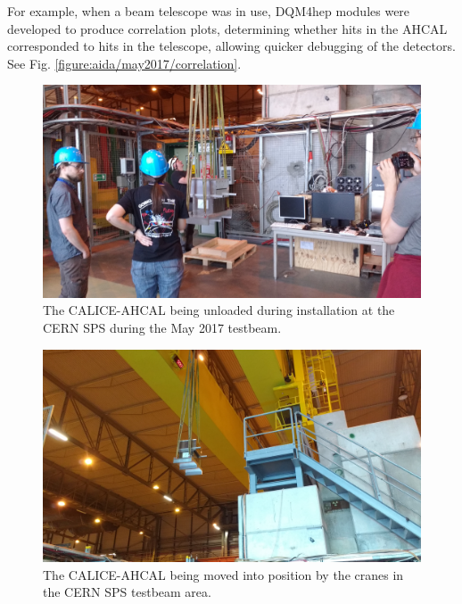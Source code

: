 For example, when a beam telescope was in use, DQM4hep modules were developed to produce correlation plots, determining whether hits in the AHCAL corresponded to hits in the telescope, allowing quicker debugging of the detectors. See Fig. \ref{figure:aida/may2017/correlation}.

\begin{figure}[p]
	\centering
	\includegraphics[width=1\textwidth]{../Pictures/AHCAL-CERN-2017-Installation-1.jpg}
	\caption{The \acrshort{CALICE}-\acrshort{AHCAL} being unloaded during installation at the \acrshort{CERN} \acrshort{SPS} during the May 2017 testbeam.}
	\label{figure:aida/may2017/installation-1}
\end{figure}

\begin{figure}[p]
	\centering
	\includegraphics[width=1\textwidth]{../Pictures/AHCAL-CERN-2017-Installation-2.jpg}
	\caption{The \acrshort{CALICE}-\acrshort{AHCAL} being moved into position by the cranes in the \acrshort{CERN} \acrshort{SPS} testbeam area.}
	\label{figure:aida/may2017/installation-2}
\end{figure}

